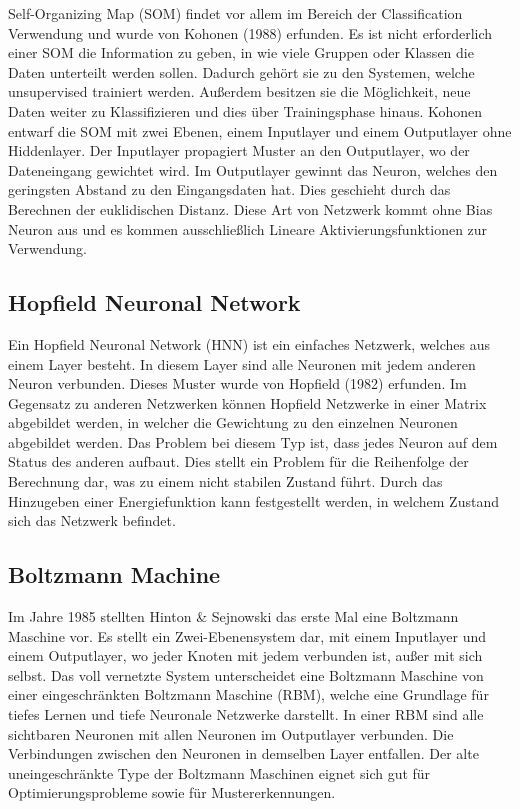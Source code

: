 Self-Organizing Map (SOM) findet vor allem im Bereich der Classification Verwendung und wurde von Kohonen (1988) erfunden. 
Es ist nicht erforderlich einer SOM die Information zu geben, in wie viele Gruppen oder Klassen die Daten unterteilt werden sollen. 
Dadurch gehört sie zu den Systemen, welche unsupervised trainiert werden. 
Außerdem besitzen sie die Möglichkeit, neue Daten weiter zu Klassifizieren und dies über Trainingsphase hinaus. 
Kohonen entwarf die SOM mit zwei Ebenen, einem Inputlayer und einem Outputlayer ohne Hiddenlayer. 
Der Inputlayer propagiert Muster an den Outputlayer, wo der Dateneingang gewichtet wird. 
Im Outputlayer gewinnt das Neuron, welches den geringsten Abstand zu den Eingangsdaten hat.
Dies geschieht durch das Berechnen der euklidischen Distanz. 
Diese Art von Netzwerk kommt ohne Bias Neuron aus und es kommen ausschließlich Lineare Aktivierungsfunktionen zur Verwendung.


\subsection{Hopfield Neuronal Network}

Ein Hopfield Neuronal Network (HNN) \cite{demuth2014neural} ist ein einfaches Netzwerk, welches aus einem Layer besteht. 
In diesem Layer sind alle Neuronen mit jedem anderen Neuron verbunden. 
Dieses Muster wurde von Hopfield (1982) erfunden. 
Im Gegensatz zu anderen Netzwerken können Hopfield Netzwerke in einer Matrix abgebildet werden, in welcher die Gewichtung zu den einzelnen Neuronen abgebildet werden. 
Das Problem bei diesem Typ ist, dass jedes Neuron auf dem Status des anderen aufbaut.
Dies stellt ein Problem für die Reihenfolge der Berechnung dar, was zu einem nicht stabilen Zustand führt.
Durch das Hinzugeben einer Energiefunktion kann festgestellt werden, in welchem Zustand sich das Netzwerk befindet.

\subsection{Boltzmann Machine}

Im Jahre 1985 stellten Hinton \& Sejnowski \cite{Hinton:Boltzman:2007} das erste Mal eine Boltzmann Maschine vor.
Es stellt ein Zwei-Ebenensystem dar, mit einem Inputlayer und einem Outputlayer, wo jeder Knoten mit jedem verbunden ist, außer mit sich selbst.
Das voll vernetzte System unterscheidet eine Boltzmann Maschine von einer eingeschränkten Boltzmann Maschine (RBM), welche eine Grundlage für tiefes Lernen und tiefe Neuronale Netzwerke darstellt.
In einer RBM sind alle sichtbaren Neuronen mit allen Neuronen im Outputlayer verbunden. 
Die Verbindungen zwischen den Neuronen in demselben Layer entfallen.
Der alte uneingeschränkte Type der Boltzmann Maschinen eignet sich gut für Optimierungsprobleme sowie für Mustererkennungen.

